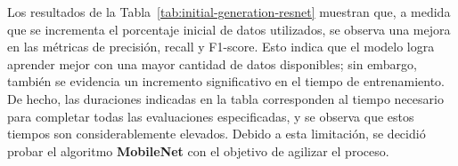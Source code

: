 \begin{table}[htp]
    \centering
    \caption{Resultados de la generación inicial con \textbf{Resnet50}}
    \label{tab:initial-generation-resnet}
\end{table}

Los resultados de la Tabla~\ref{tab:initial-generation-resnet} muestran que, a medida que se incrementa el porcentaje
inicial de datos utilizados, se observa una mejora en las métricas de precisión, recall y F1-score.
Esto indica que el modelo logra aprender mejor con una mayor cantidad de datos disponibles; sin embargo, también se
evidencia un incremento significativo en el tiempo de entrenamiento.
De hecho, las duraciones indicadas en la tabla corresponden al tiempo necesario para completar todas las evaluaciones
especificadas, y se observa que estos tiempos son considerablemente elevados.
Debido a esta limitación, se decidió probar el algoritmo \textbf{MobileNet} con el objetivo de agilizar el proceso.


